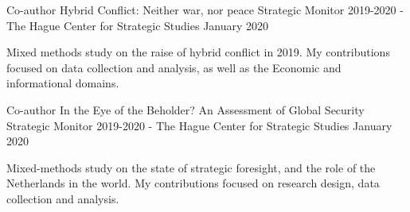 

\begin{cventries}

  \cventry
    {Co-author} %
    {Hybrid Conflict: Neither war, nor peace} %
    {Strategic Monitor 2019-2020 - The Hague Center for Strategic Studies} %
    {January 2020} %
    {
      \begin{cvitems} %
        \item {Mixed methods study on the raise of hybrid conflict in 2019. My contributions focused on data collection and analysis, as well as the Economic and informational domains.}
      \end{cvitems}
    }
  \cventry
    {Co-author} %
    {In the Eye of the Beholder? An Assessment of Global Security} %
    {Strategic Monitor 2019-2020 - The Hague Center for Strategic Studies} %
    {January 2020} %
    {
      \begin{cvitems} %
        \item {Mixed-methods study on the state of strategic foresight, and the role of the Netherlands in the world. My contributions focused on research design, data collection and analysis.}
      \end{cvitems}
    }
\end{cventries}
